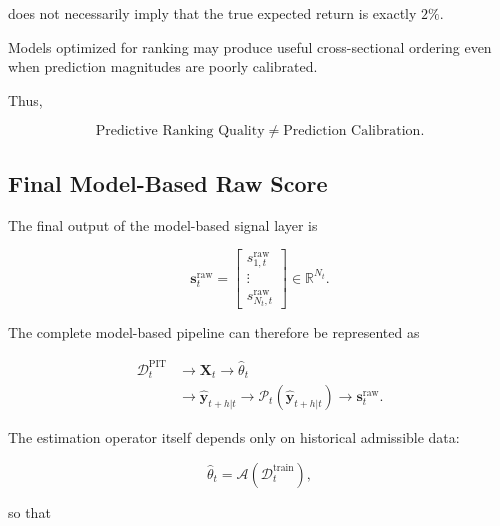 \documentclass[11pt,a4paper]{article}
\begin{document}
does not necessarily imply that the true expected return is exactly $2\%$.

Models optimized for ranking may produce useful cross-sectional ordering even
when prediction magnitudes are poorly calibrated.

Thus,

\begin{equation}
\boxed{
\text{Predictive Ranking Quality}
\neq
\text{Prediction Calibration}.
}
\end{equation}


\subsection{Final Model-Based Raw Score}
\label{subsec:final_model_based_raw_score}

The final output of the model-based signal layer is

\begin{equation}
\boxed{
\mathbf{s}_t^{\mathrm{raw}}
=
\begin{bmatrix}
s_{1,t}^{\mathrm{raw}}
\\
\vdots
\\
s_{N_t,t}^{\mathrm{raw}}
\end{bmatrix}
\in
\mathbb{R}^{N_t}.
}
\end{equation}

The complete model-based pipeline can therefore be represented as

\begin{equation}
\boxed{
\begin{aligned}
\mathcal{D}_t^{\mathrm{PIT}}
&\rightarrow
\mathbf{X}_t
\rightarrow
\widehat{\theta}_t
\\[0.1cm]
&\rightarrow
\widehat{\mathbf{y}}_{t+h|t}
\rightarrow
\mathcal{P}_t
\left(
\widehat{\mathbf{y}}_{t+h|t}
\right)
\rightarrow
\mathbf{s}_t^{\mathrm{raw}}.
\end{aligned}
}
\end{equation}

The estimation operator itself depends only on historical admissible data:

\begin{equation}
\widehat{\theta}_t
=
\mathcal{A}
\left(
\mathcal{D}_t^{\mathrm{train}}
\right),
\end{equation}

so that
\end{document}
